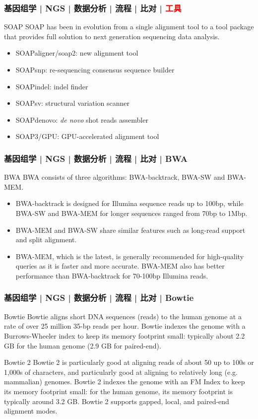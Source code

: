 \begin{frame}
  \frametitle{基因组学 | NGS | 数据分析 | 流程 | 比对 | \textcolor{red}{工具}}
  \begin{block}{SOAP}
    SOAP has been in evolution from a single alignment tool to a tool package that provides full solution to next generation sequencing data analysis.
    \begin{itemize}
      \item SOAPaligner/soap2: new alignment tool
      \item SOAPsnp: re-sequencing consensus sequence builder
      \item SOAPindel: indel finder
      \item SOAPsv: structural variation scanner
      \item SOAPdenovo: \textit{de novo} shot reads assembler
      \item SOAP3/GPU: GPU-accelerated alignment tool
    \end{itemize}
  \end{block}
\end{frame}

\begin{frame}
  \frametitle{基因组学 | NGS | 数据分析 | 流程 | 比对 | BWA}
  \begin{block}{BWA}
     BWA consists of three algorithms: BWA-backtrack, BWA-SW and BWA-MEM.
    \begin{itemize}
      \item BWA-backtrack is designed for Illumina sequence reads up to 100bp, while BWA-SW and BWA-MEM for longer sequences ranged from 70bp to 1Mbp.
      \item BWA-MEM and BWA-SW share similar features such as long-read support and split alignment.
      \item BWA-MEM, which is the latest, is generally recommended for high-quality queries as it is faster and more accurate. BWA-MEM also has better performance than BWA-backtrack for 70-100bp Illumina reads.
    \end{itemize}
  \end{block}
\end{frame}

\begin{frame}
  \frametitle{基因组学 | NGS | 数据分析 | 流程 | 比对 | Bowtie}
  \begin{block}{Bowtie}
 Bowtie aligns short DNA sequences (reads) to the human genome at a rate of over 25 million 35-bp reads per hour. Bowtie indexes the genome with a Burrows-Wheeler index to keep its memory footprint small: typically about 2.2 GB for the human genome (2.9 GB for paired-end).
  \end{block}
  \pause
  \begin{block}{Bowtie 2}
    Bowtie 2 is particularly good at aligning reads of about 50 up to 100s or 1,000s of characters, and particularly good at aligning to relatively long (e.g. mammalian) genomes. Bowtie 2 indexes the genome with an FM Index to keep its memory footprint small: for the human genome, its memory footprint is typically around 3.2 GB. Bowtie 2 supports gapped, local, and paired-end alignment modes.
  \end{block}
\end{frame}

